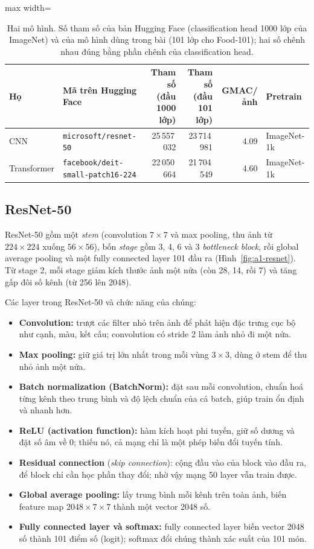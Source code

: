 \documentclass[11pt,a4paper]{article}
\begin{document}
\begin{table}[!htbp]
\centering
\small
\begin{adjustbox}{max width=\linewidth}
\begin{tabular}{llrrrl}
\toprule
Họ & Mã trên Hugging Face & Tham số (đầu 1000 lớp) & Tham số (đầu 101 lớp) & GMAC/ảnh & Pretrain \\
\midrule
CNN & \texttt{microsoft/resnet-50} & 25\,557\,032 & 23\,714\,981 & 4.09 & ImageNet-1k \\
Transformer & \texttt{facebook/deit-small-patch16-224} & 22\,050\,664 & 21\,704\,549 & 4.60 & ImageNet-1k \\
\bottomrule
\end{tabular}
\end{adjustbox}
\caption{Hai mô hình. Số tham số của bản Hugging Face (classification head 1000 lớp của ImageNet) và của mô hình dùng trong bài (101 lớp cho Food-101); hai số chênh nhau đúng bằng phần chênh của classification head.}
\label{tab:a1-models}
\end{table}

\FloatBarrier
\subsection{ResNet-50}\label{sec:a1-resnet}
ResNet-50 gồm một \emph{stem} (convolution \(7\times7\) và max pooling, thu ảnh từ \(224\times224\) xuống \(56\times56\)), bốn \emph{stage} gồm 3, 4, 6 và 3 \emph{bottleneck block}, rồi global average pooling và một fully connected layer 101 đầu ra (Hình~\ref{fig:a1-resnet}). Từ stage 2, mỗi stage giảm kích thước ảnh một nửa (còn 28, 14, rồi 7) và tăng gấp đôi số kênh (từ 256 lên 2048).

Các layer trong ResNet-50 và chức năng của chúng:
\begin{itemize}
\item \textbf{Convolution:} trượt các filter nhỏ trên ảnh để phát hiện đặc trưng cục bộ như cạnh, màu, kết cấu; convolution có stride 2 làm ảnh nhỏ đi một nửa.
\item \textbf{Max pooling:} giữ giá trị lớn nhất trong mỗi vùng \(3\times3\), dùng ở stem để thu nhỏ ảnh một nửa.
\item \textbf{Batch normalization (BatchNorm):} đặt sau mỗi convolution, chuẩn hoá từng kênh theo trung bình và độ lệch chuẩn của cả batch, giúp train ổn định và nhanh hơn.
\item \textbf{ReLU (activation function):} hàm kích hoạt phi tuyến, giữ số dương và đặt số âm về 0; thiếu nó, cả mạng chỉ là một phép biến đổi tuyến tính.
\item \textbf{Residual connection} (\emph{skip connection}): cộng đầu vào của block vào đầu ra, để block chỉ cần học phần thay đổi; nhờ vậy mạng 50 layer vẫn train được.
\item \textbf{Global average pooling:} lấy trung bình mỗi kênh trên toàn ảnh, biến feature map \(2048\times7\times7\) thành một vector 2048 số.
\item \textbf{Fully connected layer và softmax:} fully connected layer biến vector 2048 số thành 101 điểm số (logit); softmax đổi chúng thành xác suất của 101 món.
\end{itemize}
\end{document}

